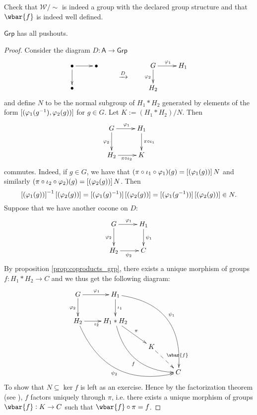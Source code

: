 \begin{exercise}
	Check that $\mathcal{W}/{\sim}$ is indeed a group with the declared group structure and that $\wbar{f}$ is indeed well defined.
\end{exercise}

\begin{proposition}
	$\mathsf{Grp}$ has all pushouts.
	\label{prop:pushouts_grp}
\end{proposition}

\begin{proof}
	Consider the diagram $D : \mathsf{A} \to \mathsf{Grp}$
	\begin{equation*}
		\xymatrix@R=0pc{
			\bullet \ar[r]\ar[dd] & \bullet & & G \ar[r]^{\varphi_1}\ar[dd]_{\varphi_2} & H_1\\
			& & \xrightarrow{D}\\
			\bullet & & & H_2
		}
	\end{equation*}
	\noindent and define $N$ to be the normal subgroup of $H_1 \ast H_2$ generated by elements of the form $\sbr[0]{(\varphi_1(g^{-1}),\varphi_2(g))}$ for $g \in G$. Let $K := (H_1 \ast H_2)/N$. Then
	\begin{equation*}
		\xymatrix{
			G \ar[r]^{\varphi_1}\ar[d]_{\varphi_2} & H_1 \ar[d]^{\pi \circ \iota_1}\\
			H_2 \ar[r]_{\pi \circ \iota_2} & K
		}
	\end{equation*}
	\noindent commutes. Indeed, if $g \in G$, we have that $(\pi \circ \iota_1 \circ \varphi_1)(g) = \sbr[0]{(\varphi_1(g))}N$ and similarly $(\pi \circ \iota_2 \circ \varphi_2)(g) = \sbr[0]{(\varphi_2(g))}N$. Then 
	\begin{equation*}
		\sbr[0]{(\varphi_1(g))}^{-1}\sbr[0]{(\varphi_2(g))} = \sbr[0]{(\varphi_1(g)^{-1})}\sbr[0]{(\varphi_2(g))} = \sbr[0]{(\varphi_1(g^{-1}))}\sbr[0]{(\varphi_2(g))} \in N.
	\end{equation*}
	Suppose that we have another cocone on $D$:
	\begin{equation*}
		\xymatrix{
			G \ar[r]^{\varphi_1}\ar[d]_{\varphi_2} & H_1 \ar[d]^{\psi_1}\\
			H_2 \ar[r]_{\psi_2} & C
		}
	\end{equation*}
	By proposition \ref{prop:coproducts_grp}, there exists a unique morphism of groups $f : H_1 \ast H_2 \to C$ and we thus get the following diagram:
		\begin{equation*}
		\xymatrix{
			G \ar[r]^{\varphi_1}\ar[d]_{\varphi_2} & H_1 \ar[d]^{\iota_1}\ar@/^3pc/[dddrr]^{\psi_1}\\
			H_2 \ar[r]_{\iota_2} \ar@/_3pc/[ddrrr]_{\psi_2} & H_1 \ast H_2 \ar[dr]^\pi\ar@/_2pc/[ddrr]_f\\
			& & K \ar@{-->}[dr]^{\wbar{f}}\\
			& & & C
		}
	\end{equation*}
	To show that $N \subseteq \ker f$ is left as an exercise. Hence by the factorization theorem (see \cite[23]{grillet:abstract_algebra:2007}), $f$ factors uniquely through $\pi$, i.e. there exists a unique morphism of groups $\wbar{f} : K \to C$ such that $\wbar{f} \circ \pi = f$.
\end{proof}

